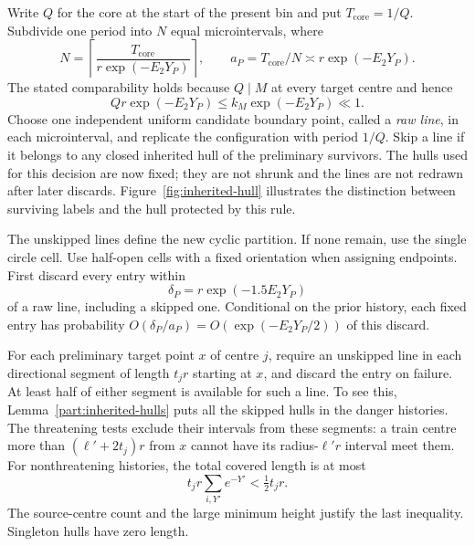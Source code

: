 Write $Q$ for the core at the start of the present bin and put
$T_{\mathrm{core}}=1/Q$.  Subdivide one period into $N$ equal
microintervals, where
\[
 N=\left\lceil\frac{T_{\mathrm{core}}}{r\exp(-E_2Y_P)}\right\rceil,
 \qquad a_P=T_{\mathrm{core}}/N\asymp r\exp(-E_2Y_P).
\]
The stated comparability holds because $Q\mid M$ at every target
centre and hence
\[
 Qr\exp(-E_2Y_P)
 \le k_M\exp(-E_2Y_P)\ll1.
\]
Choose one independent uniform candidate boundary point, called a
\emph{raw line}, in each microinterval, and replicate the
configuration with period $1/Q$.  Skip a line if it
belongs to any closed inherited hull of the preliminary survivors.
The hulls used for this decision are now fixed; they are not
shrunk and the lines are not redrawn after later discards.
Figure~\ref{fig:inherited-hull} illustrates the distinction between
surviving labels and the hull protected by this rule.



The unskipped lines define the new cyclic partition.  If none
remain, use the single circle cell.  Use half-open cells with a
fixed orientation when assigning endpoints.  First discard every
entry within
\[
 \delta_P=r\exp(-1.5E_2Y_P)
\]
of a raw line, including a skipped one.  Conditional on the prior
history, each fixed entry has probability
$O(\delta_P/a_P)=O(\exp(-E_2Y_P/2))$ of this discard.

For each preliminary target point $x$ of centre $j$, require an
unskipped line in each directional segment of length $t_jr$
starting at $x$, and discard the entry on failure.  At least half
of either segment is available for such a line.  To see this,
Lemma~\ref{part:inherited-hulls} puts all the skipped hulls in the
danger histories.  The threatening tests exclude their intervals
from these segments: a train centre more than
$(\ell'+2t_j)r$ from $x$ cannot have its radius-$\ell'r$ interval
meet them.  For nonthreatening histories, the total covered length
is at most
\[
 t_jr\sum_{i,Y'}e^{-Y'}<\tfrac12t_jr.
\]
The source-centre count and the large minimum height justify the
last inequality.  Singleton hulls have zero length.

